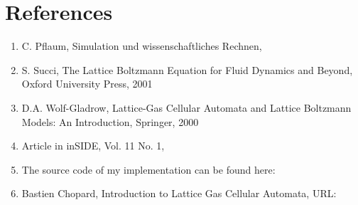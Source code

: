 
\section{References}
\begin{enumerate}
\item
C. Pflaum, Simulation und wissenschaftliches Rechnen,\\
\sloppy
{}
\item
S. Succi, The Lattice Boltzmann Equation for Fluid Dynamics and Beyond, Oxford University Press, 2001
\item
D.A. Wolf-Gladrow, Lattice-Gas Cellular Automata and Lattice Boltzmann Models: An Introduction, Springer, 2000
\item
Article in inSIDE, Vol. 11 No. 1,\\
\sloppy
{}
\item
The source code of my implementation can be found here:
\sloppy
{}
\item
Bastien Chopard, Introduction to Lattice Gas Cellular Automata, URL:
\sloppy
{}
\end{enumerate}


